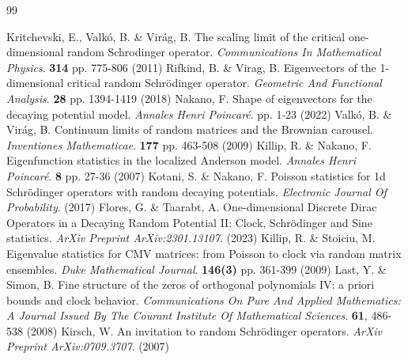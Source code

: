 \documentclass[12pt, reqno]{amsart}
\theoremstyle{definition}
\theoremstyle{remark}
\numberwithin{equation}{section}
\begin{document}
\begin{thebibliography}{99}



Kritchevski, E., Valkó, B. \& Virág, B. The scaling limit of the critical one-dimensional random Schrodinger operator. {\em Communications In Mathematical Physics}. \textbf{314} pp. 775-806 (2011)
Rifkind, B. \& Virag, B. Eigenvectors of the 1-dimensional critical random Schrödinger operator. {\em Geometric And Functional Analysis}. \textbf{28} pp. 1394-1419 (2018)
Nakano, F. Shape of eigenvectors for the decaying potential model. {\em Annales Henri Poincaré}. pp. 1-23 (2022)
Valkó, B. \& Virág, B. Continuum limits of random matrices and the Brownian carousel. {\em Inventiones Mathematicae}. \textbf{177} pp. 463-508 (2009)
Killip, R. \& Nakano, F. Eigenfunction statistics in the localized Anderson model. {\em Annales Henri Poincaré}. \textbf{8} pp. 27-36 (2007)
Kotani, S. \& Nakano, F. Poisson statistics for 1d Schrödinger operators with random decaying potentials. {\em Electronic Journal Of Probability}. (2017)
Flores, G. \& Taarabt, A. One-dimensional Discrete Dirac Operators in a Decaying Random Potential II: Clock, Schrödinger and Sine statistics. {\em ArXiv Preprint ArXiv:2301.13107}. (2023)
Killip, R. \& Stoiciu, M. Eigenvalue statistics for CMV matrices: from Poisson to clock via random matrix ensembles. {\em Duke Mathematical Journal}. \textbf{146(3)} pp. 361-399 (2009)
Last, Y. \& Simon, B. Fine structure of the zeros of orthogonal polynomials IV: a priori bounds and clock behavior. {\em Communications On Pure And Applied Mathematics: A Journal Issued By The Courant Institute Of Mathematical Sciences}. \textbf{61}, 486-538 (2008)
Kirsch, W. An invitation to random Schrödinger operators. {\em ArXiv Preprint ArXiv:0709.3707}. (2007)





\end{thebibliography}
\end{document}
